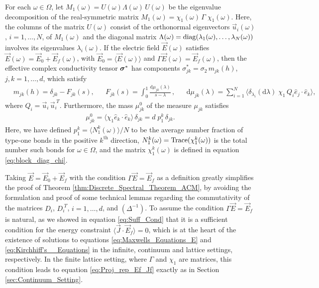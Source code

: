 \documentclass{cmslatex}
\renewcommand{\d}{\text{d}}
\newcommand\bsig{\mbox{\boldmath${\sigma}$}}
\begin{document}
\vspace{0.15in}
% 
\begin{theorem}\label{thm:Discrete_Spectral_Theorem_ACM}
  For each $\omega\in\Omega$, let $M_1(\omega)=U(\omega)\Lambda(\omega)\,U(\omega)$ be the eigenvalue
  decomposition of the real-symmetric matrix
  $M_1(\omega)=\chi_1(\omega)\,\Gamma\;\chi_1(\omega)$. Here, the columns of the matrix $U(\omega)$
  consist of the orthonormal eigenvectors $\vec{u}_i(\omega)$, $i=1,\ldots,N$,
  of $M_1(\omega)$ and the diagonal matrix $\Lambda(\omega)={\rm diag}(\lambda_1(\omega),\ldots,\lambda_N(\omega))$
  involves its eigenvalues $\lambda_i(\omega)$. If the electric field
  $\vec{E}(\omega)$ satisfies $\vec{E}(\omega)=\vec{E}_0+\vec{E}_f(\omega)$, with
  $\vec{E}_0=\langle\vec{E}(\omega)\rangle$ and $\Gamma\vec{E}(\omega)=\vec{E}_f(\omega)$, then the
  effective complex conductivity tensor $\bsig^*$ has components
  $\sigma_{jk}^*=\sigma_2\,m_{jk}(h)$, $j,k=1,\ldots,d$,  which satisfy       
%
\begin{align}\label{eq:Stieltjes_F_Discrete}
  &m_{jk}(h)=\delta_{jk}-F_{jk}(s), 
  &&F_{jk}(s)=\int_0^1\frac{\d\mu_{jk}(\lambda)}{s-\lambda}\,, 
  &&\d\mu_{jk}(\lambda)=\sum_{i=1}^N\langle \delta_{\lambda_i}(\d\lambda)\;\chi_1\,Q_i\hat{e}_j\cdot\hat{e}_k\rangle,  
\end{align}
%
where $Q_i=\vec{u}_i\,\vec{u}_i^{\;T}$. Furthermore, the mass $\mu_{jk}^0$ of the
measure $\mu_{jk}$ satisfies 
%
\begin{align}\label{eq:Measure_Mass_theorem}
  \mu_{jk}^0=\langle\chi_1\hat{e}_k\cdot\hat{e}_k\rangle\,\delta_{jk}
       =d\;p_1^k\,\delta_{jk}.
\end{align}
%
Here, we have defined $p_1^k=\langle N_1^k(\omega)\rangle/N$ to be the average number
fraction of type-one bonds in the positive $k^{\text{th}}$ direction,
$N_1^k(\omega)={\rm Trace}(\chi_1^k(\omega))$ is the total number such bonds for
$\omega\in\Omega$, and the matrix $\chi_1^k(\omega)$ is defined in equation
\eqref{eq:block_diag_chi}.  
% 
\end{theorem}


Taking $\vec{E}=\vec{E}_0+\vec{E}_f$ with the 
condition $\Gamma\vec{E}=\vec{E}_f$ as a definition greatly simplifies the
proof of Theorem \ref{thm:Discrete_Spectral_Theorem_ACM}, by avoiding
the formulation and proof of some technical lemmas regarding the
commutativity of the matrices $D_i$, $D_i^{\;T}$, $i=1,\ldots,d$, and
$(\Delta^{-1})$. To assume the condition $\Gamma\vec{E}=\vec{E}_f$ is natural, 
as we showed in equation \eqref{eq:Suff_Cond} that it is a 
sufficient condition for the energy constraint
$\langle\vec{J}\cdot\vec{E}_f\rangle=0$, which is at the heart of the existence of
solutions to equations \eqref{eq:Maxwells_Equations_E} and
\eqref{eq:Kirchhiff's__Equations} in the infinite, continuum and
lattice settings, respectively. In the finite lattice setting, where
$\Gamma$ and $\chi_1$ are matrices, this condition leads to equation
\eqref{eq:Proj_rep_Ef_Jf} exactly as in Section
\ref{sec:Continuum_Setting}.  
\end{document}
